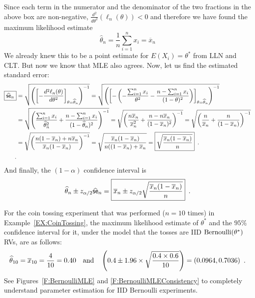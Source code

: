 \begin{example}
Since each term in the numerator and the denominator of the two fractions in the above box are non-negative, $\frac{d^2}{d \theta^2} (\ell_n(\theta))< 0$ and therefore we have found the maximum likelihood estimate
\[
\widehat{\theta}_n  = \frac{1}{n} \sum_{i=1}^n x_i = \overline{x}_n
\]
We already knew this to be a point estimate for $E(X_i)=\theta^*$ from LLN and CLT.  But now we know that MLE also agrees.
Now, let us find the estimated standard error:
\begin{align*}
\boxed{\widehat{\mathsf{se}}_n} 
&= \sqrt{\left( \left[ -\frac{d^2 \ell_n(\theta)}{d \theta^2}\right]_{\theta=\widehat{\theta}_n}\right)^{-1}} 
= \sqrt{\left( \left[ - \left( -\frac{{\sum_{i=1}^n x_i}}{\theta^2} - \frac{n-{\sum_{i=1}^n x_i}}{(1-\theta)^2}\right) \right]_{\theta=\widehat{\theta}_n}\right)^{-1}} \\
&= \sqrt{\left( \frac{{\sum_{i=1}^n x_i}}{\widehat{\theta}_n^2} + \frac{n-{\sum_{i=1}^n x_i}}{(1-\widehat{\theta}_n)^2} \right)^{-1}}
= \sqrt{\left( \frac{n\overline{x}_n}{\overline{x}_n^2} + \frac{n-n\overline{x}_n}{(1-\overline{x}_n)^2} \right)^{-1}}
= \sqrt{\left( \frac{n}{\overline{x}_n} + \frac{n}{(1-\overline{x}_n)} \right)^{-1}}\\
&= \sqrt{\left( \frac{n(1-\overline{x}_n)+n\overline{x}_n}{\overline{x}_n(1-\overline{x}_n)} \right)^{-1}}
= \sqrt{\frac{\overline{x}_n(1-\overline{x}_n)}{n((1-\overline{x}_n)+\overline{x}_n}}
= \boxed{\sqrt{\frac{\overline{x}_n(1-\overline{x}_n)}{n}}} \enspace .\\
\enspace .
\end{align*}
And finally, the $(1-\alpha)$ confidence interval is
\[
\widehat{\theta}_n \pm z_{\alpha/2} \widehat{\mathsf{se}}_n 
= \boxed{\overline{x}_n \pm z_{\alpha/2} \sqrt{\frac{\overline{x}_n(1-\overline{x}_n)}{n}}} \enspace . 
\]

For the coin tossing experiment that was performed ($n=10$ times) in Example~\ref{EX:CoinTossing}, the maximum likelihood estimate of $\theta^*$ and the $95\%$ confidence interval for it, under the model that the tosses are IID $\mbox{{\rm Bernoulli}}(\theta^*)$ RVs, are as follows:
\[
\widehat{\theta}_{10} 
= \overline{x}_{10} =\frac{4}{10}=0.40
\quad \text{and} \quad \left(0.4 \pm 1.96 \times \sqrt{\frac{0.4 \times 0.6}{10}}\right) =  (0.0964, 0.7036) \enspace .
\]
See Figures~\ref{F:BernoulliMLE} and \ref{F:BernoulliMLEConsistency} to completely understand parameter estimation for IID Bernoulli experiments.
\end{example}


